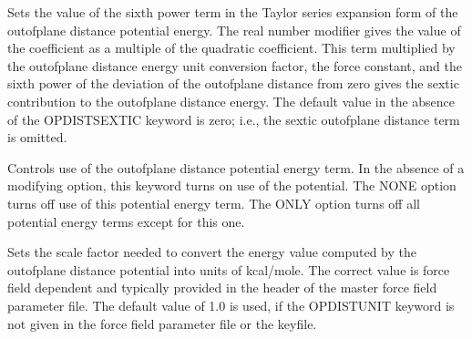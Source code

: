 \documentclass[letterpaper,11pt,english]{sphinxmanual}
\begin{document}
\ignorespaces {}\label{\detokenize{text/keywords:key-opdist-sextic}}\begin{description}
\sphinxAtStartPar
Sets the value of the sixth power term in the Taylor series expansion form of the out\sphinxhyphen{}of\sphinxhyphen{}plane distance potential energy. The real number modifier gives the value of the coefficient as a multiple of the quadratic coefficient. This term multiplied by the out\sphinxhyphen{}of\sphinxhyphen{}plane distance energy unit conversion factor, the force constant, and the sixth power of the deviation of the out\sphinxhyphen{}of\sphinxhyphen{}plane distance from zero gives the sextic contribution to the out\sphinxhyphen{}of\sphinxhyphen{}plane distance energy. The default value in the absence of the OPDIST\sphinxhyphen{}SEXTIC keyword is zero; i.e., the sextic out\sphinxhyphen{}of\sphinxhyphen{}plane distance term is omitted.

\end{description}

\ignorespaces {}\label{\detokenize{text/keywords:key-opdistterm}}\begin{description}
\sphinxAtStartPar
Controls use of the out\sphinxhyphen{}of\sphinxhyphen{}plane distance potential energy term. In the absence of a modifying option, this keyword turns on use of the potential. The NONE option turns off use of this potential energy term. The ONLY option turns off all potential energy terms except for this one.

\end{description}

\ignorespaces {}\label{\detokenize{text/keywords:key-opdistunit}}\begin{description}
\sphinxAtStartPar
Sets the scale factor needed to convert the energy value computed by the out\sphinxhyphen{}of\sphinxhyphen{}plane distance potential into units of kcal/mole. The correct value is force field dependent and typically provided in the header of the master force field parameter file. The default value of 1.0 is used, if the OPDISTUNIT keyword is not given in the force field parameter file or the keyfile.

\end{description}
\end{document}
